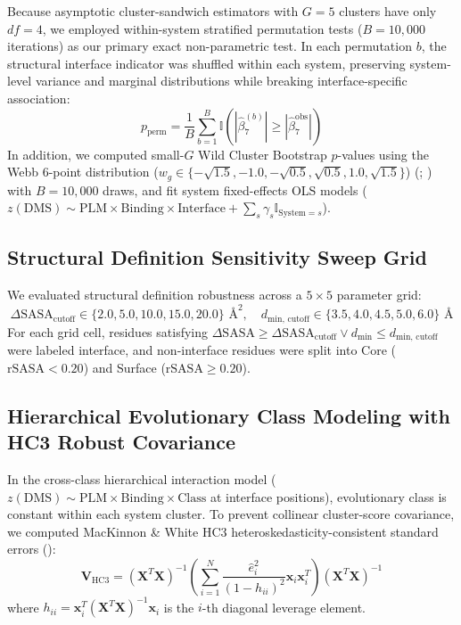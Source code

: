 \documentclass[
  11pt,
  us-letterpaper,
  DIV=11,
  numbers=noendperiod]{scrartcl}
\begin{document}
Because asymptotic cluster-sandwich estimators with \(G = 5\) clusters
have only \(df = 4\), we employed within-system stratified permutation
tests (\(B = 10,000\) iterations) as our primary exact non-parametric
test. In each permutation \(b\), the structural interface indicator was
shuffled within each system, preserving system-level variance and
marginal distributions while breaking interface-specific association:
\[p_{\text{perm}} = \frac{1}{B} \sum_{b=1}^B \mathbb{I}\left( |\hat{\beta}_{7}^{(b)}| \ge |\hat{\beta}_{7}^{\text{obs}}| \right)\]
In addition, we computed small-\(G\) Wild Cluster Bootstrap \(p\)-values
using the Webb 6-point distribution
(\(w_g \in \{-\sqrt{1.5}, -1.0, -\sqrt{0.5}, \sqrt{0.5}, 1.0, \sqrt{1.5}\}\))
(;
) with
\(B = 10,000\) draws, and fit system fixed-effects OLS models
(\(z(\text{DMS}) \sim \text{PLM} \times \text{Binding} \times \text{Interface} + \sum_s \gamma_s \mathbb{I}_{\text{System}=s}\)).

\subsection{Structural Definition Sensitivity Sweep
Grid}\label{structural-definition-sensitivity-sweep-grid}

We evaluated structural definition robustness across a \(5 \times 5\)
parameter grid:
\[\Delta\text{SASA}_{\text{cutoff}} \in \{2.0, 5.0, 10.0, 15.0, 20.0\}\text{ \AA}^2, \quad d_{\text{min, cutoff}} \in \{3.5, 4.0, 4.5, 5.0, 6.0\}\text{ \AA}\]
For each grid cell, residues satisfying
\(\Delta\text{SASA} \ge \Delta\text{SASA}_{\text{cutoff}} \lor d_{\text{min}} \le d_{\text{min, cutoff}}\)
were labeled interface, and non-interface residues were split into Core
(\(\text{rSASA} < 0.20\)) and Surface (\(\text{rSASA} \ge 0.20\)).

\subsection{Hierarchical Evolutionary Class Modeling with HC3 Robust
Covariance}\label{hierarchical-evolutionary-class-modeling-with-hc3-robust-covariance}

In the cross-class hierarchical interaction model
(\(z(\text{DMS}) \sim \text{PLM} \times \text{Binding} \times \text{Class}\)
at interface positions), evolutionary class is constant within each
system cluster. To prevent collinear cluster-score covariance, we
computed MacKinnon \& White HC3 heteroskedasticity-consistent standard
errors ():
\[\mathbf{V}_{\text{HC3}} = (\mathbf{X}^T \mathbf{X})^{-1} \left( \sum_{i=1}^N \frac{\hat{e}_i^2}{(1 - h_{ii})^2} \mathbf{x}_i \mathbf{x}_i^T \right) (\mathbf{X}^T \mathbf{X})^{-1}\]
where
\(h_{ii} = \mathbf{x}_i^T (\mathbf{X}^T \mathbf{X})^{-1} \mathbf{x}_i\)
is the \(i\)-th diagonal leverage element.
\end{document}
